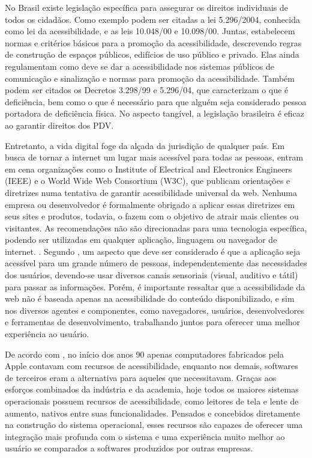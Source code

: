 \documentclass[english,brazilian]{UNISINOSmonografia}
\begin{document}
No Brasil existe legislação específica para assegurar os direitos individuais de todos os cidadãos. Como exemplo podem ser citadas a lei 5.296/2004, conhecida como lei da acessibilidade, e as leis 10.048/00 e 10.098/00. Juntas, estabelecem normas e critérios básicos para a promoção da acessibilidade, descrevendo regras de construção de espaços públicos, edifícios de uso público e privado. Elas ainda regulamentam como deve se dar a acessibilidade nos sistemas públicos de comunicação e sinalização e normas para promoção da acessibilidade. Também podem ser citados os Decretos 3.298/99 e 5.296/04, que caracterizam o que é deficiência, bem como o que é necessário para que alguém seja considerado pessoa portadora de deficiência física. No aspecto tangível, a legislação brasileira é eficaz ao garantir direitos dos PDV.

Entretanto, a vida digital foge da alçada da jurisdição de qualquer país. Em busca de tornar a internet um lugar mais acessível para todas as pessoas, entram em cena organizações como o Institute of Electrical and Electronics Engineers (IEEE) e o World Wide Web Consortium (W3C), que publicam orientações e diretrizes numa tentativa de garantir acessibilidade universal da web. Nenhuma empresa ou desenvolvedor é formalmente obrigado a aplicar essas diretrizes em seus sites e produtos, todavia, o fazem com o objetivo de atrair mais clientes ou visitantes. As recomendações não são direcionadas para uma tecnologia específica, podendo ser utilizadas em qualquer aplicação, linguagem ou navegador de internet. \cite{W3Cguideliness}. Segundo , um aspecto que deve ser considerado é que a aplicação seja acessível para um grande número de pessoas, independentemente das necessidades dos usuários, devendo-se usar diversos canais sensoriais (visual, auditivo e tátil) para passar as informações. Porém, é importante ressaltar que a acessibilidade da web não é baseada apenas na acessibilidade do conteúdo disponibilizado, e sim nos diversos agentes e componentes, como navegadores, usuários, desenvolvedores e ferramentas de desenvolvimento, trabalhando juntos para oferecer uma melhor experiência ao usuário.

De acordo com , no início dos anos 90 apenas computadores fabricados pela Apple contavam com recursos de acessibilidade, enquanto nos demais, softwares de terceiros eram a alternativa para aqueles que necessitavam. Graças aos esforços combinados da indústria e da academia, hoje todos os maiores sistemas operacionais possuem recursos de acessibilidade, como leitores de tela e lente de aumento, nativos entre suas funcionalidades. Pensados e concebidos diretamente na construção do sistema operacional, esses recursos são capazes de oferecer uma integração mais profunda com o sistema e uma experiência muito melhor ao usuário se comparados a softwares produzidos por outras empresas. 
\end{document}
